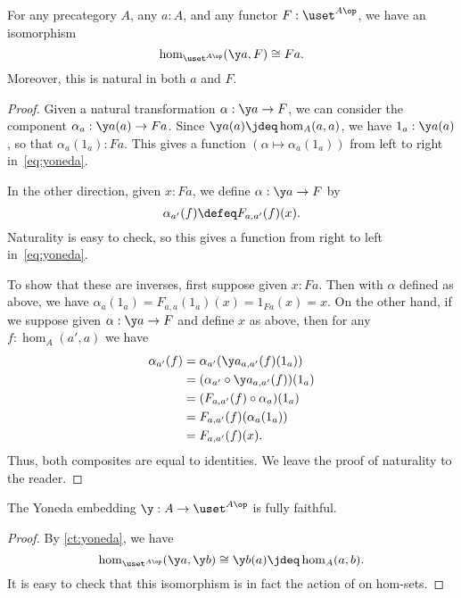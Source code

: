 \begin{thm}\label{ct:yoneda}
  For any precategory $A$, any $a:A$, and any functor $F:\uset^{A\op}$, we have an isomorphism
  \begin{equation}\label{eq:yoneda}
    \hom_{\uset^{A\op}}(\y a, F) \cong Fa.
  \end{equation}
  Moreover, this is natural in both $a$ and $F$.
\end{thm}
\begin{proof}
  Given a natural transformation $\alpha:\y a \to F$, we can consider the component $\alpha_a : \y a(a) \to F a$.
  Since $\y a(a)\jdeq \hom_A(a,a)$, we have $1_a : \y a(a)$, so that $\alpha_a(1_a) : F a$.
  This gives a function $(\alpha \mapsto \alpha_a(1_a))$ from left to right in~\eqref{eq:yoneda}.

  In the other direction, given $x:F a$, we define $\alpha:\y a \to F$ by
  \[\alpha_{a'}(f) \defeq F_{a,a'}(f)(x). \]
  Naturality is easy to check, so this gives a function from right to left in~\eqref{eq:yoneda}.

  To show that these are inverses, first suppose given $x:F a$.
  Then with $\alpha$ defined as above, we have $\alpha_a(1_a) = F_{a,a}(1_a)(x) = 1_{F a}(x) = x$.
  On the other hand, if we suppose given $\alpha:\y a \to F$ and define $x$ as above, then for any $f:\hom_A(a',a)$ we have
  \begin{align*}
    \alpha_{a'}(f)
    &= \alpha_{a'} (\y a_{a,a'}(f)(1_a))\\
    &= (\alpha_{a'}\circ \y a_{a,a'}(f))(1_a)\\
    &= (F_{a,a'}(f)\circ \alpha_a)(1_a)\\
    &= F_{a,a'}(f)(\alpha_a(1_a))\\
    &= F_{a,a'}(f)(x).
  \end{align*}
  Thus, both composites are equal to identities.
  We leave the proof of naturality to the reader.
\end{proof}

\begin{cor}\label{ct:yoneda-embedding}
  The Yoneda embedding $\y :A\to \uset^{A\op}$ is fully faithful.
\end{cor}
\begin{proof}
  By \cref{ct:yoneda}, we have
  \[ \hom_{\uset^{A\op}}(\y a, \y b) \cong \y b(a) \jdeq \hom_A(a,b). \]
  It is easy to check that this isomorphism is in fact the action of \y on hom-sets.
\end{proof}

